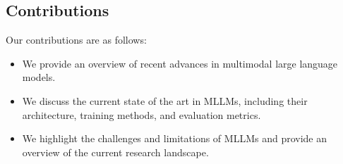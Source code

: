 \documentclass{article}
\begin{document}
\subsection{Contributions}

Our contributions are as follows:

\begin{itemize}
\item We provide an overview of recent advances in multimodal large language models.
\item We discuss the current state of the art in MLLMs, including their architecture, training methods, and evaluation metrics.
\item We highlight the challenges and limitations of MLLMs and provide an overview of the current research landscape.
\end{itemize}
\end{document}
